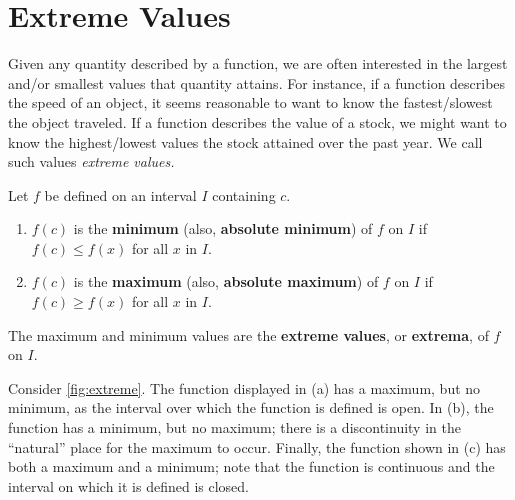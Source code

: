 \section{Extreme Values}\label{sec:extreme_values}


Given any quantity described by a function, we are often interested in the largest and/or smallest values that quantity attains. For instance, if a function describes the speed of an object, it seems reasonable to want to know the fastest/slowest the object traveled. If a function describes the value of a stock, we might want to know the highest/lowest values the stock attained over the past year. We call such values \textit{extreme values.}

%
{Let $f$ be defined on an interval $I$ containing $c$.
\begin{enumerate}
	\item	$f(c)$ is the \textbf{minimum} (also, \textbf{absolute minimum}) of $f$ on $I$ if $f(c) \leq f(x)$ for all $x$ in $I$.
	\item	$f(c)$ is the \textbf{maximum} (also, \textbf{absolute maximum}) of $f$ on $I$ if $f(c) \geq f(x)$ for all $x$ in $I$.
\end{enumerate}
The maximum and minimum values are the \textbf{extreme values}, or \textbf{extrema}, of $f$ on $I$.}


Consider \autoref{fig:extreme}. The function displayed in (a) has a maximum, but no minimum, as the interval over which the function is defined is open. In (b), the function has a minimum, but no maximum; there is a discontinuity in the ``natural'' place for the maximum to occur. Finally, the function shown in (c) has both a maximum and a minimum; note that the function is continuous and the interval on which it is defined is closed. 
 
